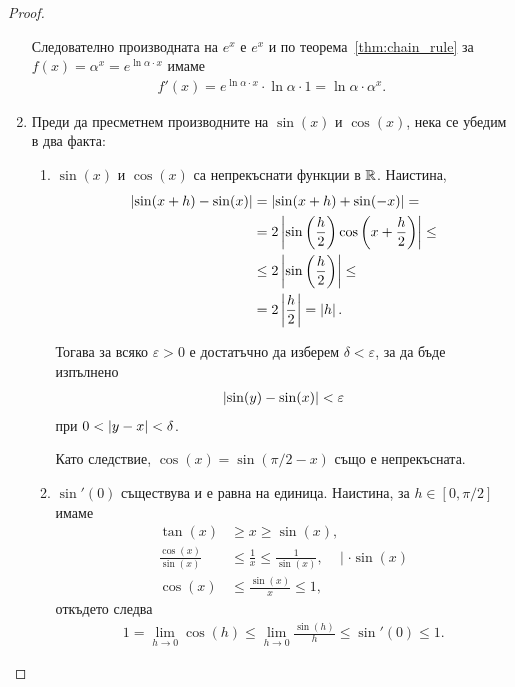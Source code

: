 \documentclass[numbers=endperiod, bibliography=totocnumbered]{scrartcl}
\begin{document}
\begin{proof}
\begin{enumerate}
    Следователно производната на \( e^x \) е \( e^x \) и по теорема~\ref{thm:chain_rule} за \( f(x) = \alpha^x = e^{\ln \alpha \cdot x} \) имаме
    \begin{align*}
      f'(x)
      =
      e^{\ln \alpha \cdot x} \cdot \ln \alpha \cdot 1
      =
      \ln \alpha \cdot \alpha^x.
    \end{align*}

    \item Преди да пресметнем производните на \( \sin(x) \) и \( \cos(x) \), нека се убедим в два факта:
    \begin{enumerate}
      \item \( \sin(x) \) и \( \cos(x) \) са непрекъснати функции в \( \mathbb{R} \). Наистина,
      \begin{align*}
        \left\vert \sin(x+h) - \sin(x) \right\vert
        &=
        \left\vert \sin(x+h) + \sin(-x) \right\vert
        = \\ &=
        2 \left\vert \sin\left(\frac h 2 \right) \cos \left( x+ \frac h 2 \right) \right\vert
        \leq \\ &\leq
        2 \left\vert \sin\left(\frac h 2 \right) \right\vert
        \leq \\ &=
        2 \left\vert \frac h 2 \right\vert
        =
        \left\vert h \right\vert.
      \end{align*}

      Тогава за всяко \( \varepsilon > 0 \) е достатъчно да изберем \( \delta < \varepsilon \), за да бъде изпълнено
      \begin{align*}
        \left\vert \sin(y) - \sin(x) \right\vert < \varepsilon
      \end{align*}
      при \( 0 < \left\vert y - x \right\vert < \delta \).

      Като следствие, \( \cos(x) = \sin(\pi / 2 - x) \) също е непрекъсната.

      \item \( \sin'(0) \) съществува и е равна на единица. Наистина, за \( h \in [0, \pi / 2] \) имаме
      \begin{align*}
        \tan(x) &\geq x \geq \sin(x),
        \\
        \frac {\cos(x)} {\sin(x)} &\leq \frac 1 x \leq \frac 1 {\sin(x)},~~~~\mid \cdot \sin(x)
        \\
        \cos(x) &\leq \frac {\sin(x)} x \leq 1,
      \end{align*}
      откъдето следва
      \begin{align*}
        1
        =
        \lim_{h \to 0} \cos(h)
        \leq
        \lim_{h \to 0} \frac {\sin(h)} h
        \leq
        \sin'(0)
        \leq
        1.
      \end{align*}
    \end{enumerate}


\end{enumerate}
\end{proof}
\end{document}

